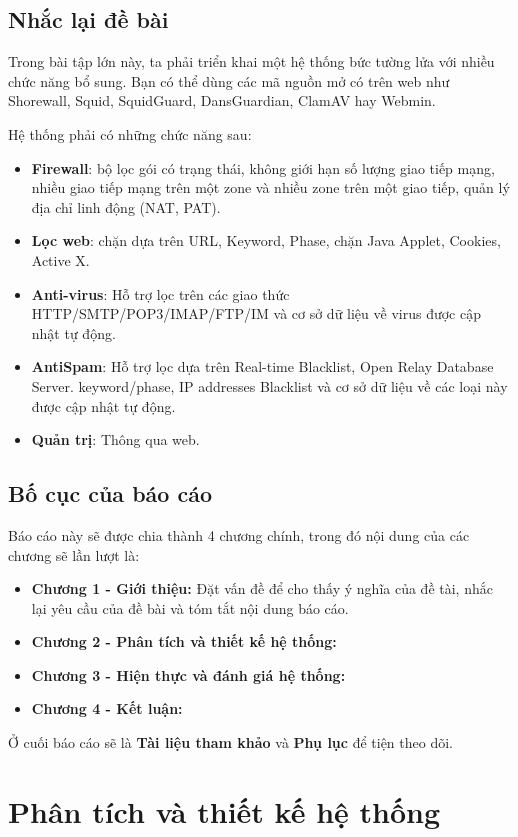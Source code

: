 \documentclass[12pt,titlepage,a4paper]{article}
\begin{document}
	\subsection{Nhắc lại đề bài}
	Trong bài tập lớn này, ta phải triển khai một hệ thống bức tường lửa với nhiều chức năng bổ sung. Bạn có thể dùng các mã nguồn mở có trên web như Shorewall, Squid, SquidGuard, DansGuardian, ClamAV hay Webmin.
	\par
	Hệ thống phải có những chức năng sau:
	\begin{itemize}
		\item \textbf{Firewall}: bộ lọc gói có trạng thái, không giới hạn số lượng giao tiếp mạng, nhiều giao tiếp mạng trên một zone và nhiều zone trên một giao tiếp, quản lý địa chỉ linh động (NAT, PAT).
		\item \textbf{Lọc web}: chặn dựa trên URL, Keyword, Phase, chặn Java Applet, Cookies, Active X.
		\item \textbf{Anti-virus}: Hỗ trợ lọc trên các giao thức HTTP/SMTP/POP3/IMAP/FTP/IM và cơ sở dữ liệu về virus được cập nhật tự động.
		\item \textbf{AntiSpam}: Hỗ trợ lọc dựa trên Real-time Blacklist, Open Relay Database Server. keyword/phase, IP addresses Blacklist và cơ sở dữ liệu về các loại này được cập nhật tự động.
		\item \textbf{Quản trị}: Thông qua web.
	\end{itemize}
	\subsection{Bố cục của báo cáo}
	Báo cáo này sẽ được chia thành 4 chương chính, trong đó nội dung của các chương sẽ lần lượt là:
	\begin{itemize}
		\item \textbf{Chương 1 - Giới thiệu:} Đặt vấn đề để cho thấy ý nghĩa của đề tài, nhắc lại yêu cầu của đề bài và tóm tắt nội dung báo cáo.
		\item \textbf{Chương 2 - Phân tích và thiết kế hệ thống:}
		\item \textbf{Chương 3 - Hiện thực và đánh giá hệ thống:}
		\item \textbf{Chương 4 - Kết luận:}
	\end{itemize}
	Ở cuối báo cáo sẽ là \textbf{Tài liệu tham khảo} và \textbf{Phụ lục} để tiện theo dõi.

	\section{Phân tích và thiết kế hệ thống}
\end{document}
